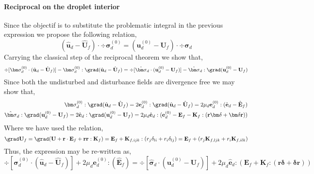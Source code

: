 \paragraph*{Reciprocal on the droplet interior}
Since the objectif is to substitute the problematic integral in the previous expression we propose the following relation, 
\begin{equation*}
    (\hat{\textbf{u}}_d - \hat{\textbf{U}}_f)\cdot \div \bm\sigma_d^{(0)}
    = 
    (\textbf{u}_d^{(0)} - \textbf{U}_f)\cdot \div \hat{\bm\sigma}_d
\end{equation*}
Carrying the classical step of the reciprocal theorem we show that, 
\begin{equation*}
    \div [\bm\sigma_d^{(0)}  \cdot (\hat{\textbf{u}}_d - \hat{\textbf{U}}_f)]
    - \bm\sigma_d^{(0)} : \grad (\hat{\textbf{u}}_d - \hat{\textbf{U}}_f)
    = 
    \div [\hat{\bm\sigma}_d \cdot (\textbf{u}_d^{(0)} - \textbf{U}_f)]
    - \hat{\bm\sigma}_d : \grad (\textbf{u}_d^{(0)} - \textbf{U}_f)
\end{equation*}
Since both the undisturbed and disturbance fields are divergence free we may show that, 
\begin{align}
    \bm\sigma_d^{(0)} : \grad (\hat{\textbf{u}}_d - \hat{\textbf{U}}_f)
    = 
    2\textbf{e}_d^{(0)} : \grad (\hat{\textbf{u}}_d - \hat{\textbf{U}}_f)
    = 
    2\mu_d \textbf{e}_d^{(0)} : (\hat{\textbf{e}}_d - \hat{\textbf{E}}_f)\\
    \hat{\bm\sigma}_d : \grad (\textbf{u}_d^{(0)} - \textbf{U}_f)
    = 
    2\hat{\textbf{e}}_d : \grad (\textbf{u}_d^{(0)} - \textbf{U}_f)
    =
    2\mu_d \hat{\textbf{e}}_d : (\textbf{e}_d^{(0)} - \textbf{E}_f - \textbf{K}_f : (\textbf{r} \bm\delta + \bm\delta \textbf{r}))
\end{align}
Where we have used the relation, 
\begin{equation*}
    \grad \textbf{U}_f 
    = 
    \grad (\textbf{U} + \textbf{r}\cdot \textbf{E}_f + \textbf{rr} : \textbf{K}_f )
    =
    \textbf{E}_f 
    + \textbf{K}_{f,ijk} : (r_j \delta_{li} +r_i \delta_{lj})
    =
    \textbf{E}_f 
    +  (r_j \textbf{K}_{f,ljk} + r_i \textbf{K}_{f,ilk})
\end{equation*}
Thus, the expression may be re-written as, 
\begin{equation*}
    \div [\bm\sigma_d^{(0)}  \cdot (\hat{\textbf{u}}_d - \hat{\textbf{U}}_f)]
    + 2\mu_d \textbf{e}_d^{(0)} : (  \hat{\textbf{E}}_f)
    = 
    \div [\hat{\bm\sigma}_d \cdot (\textbf{u}_d^{(0)} - \textbf{U}_f)]
    + 2\mu_d \hat{\textbf{e}}_d : (  \textbf{E}_f + \textbf{K}_f : (\textbf{r} \bm\delta + \bm\delta \textbf{r}))
\end{equation*}

